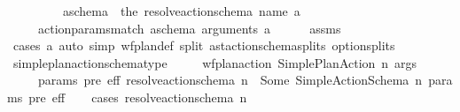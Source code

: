 \begin{isabellebody}
\ \ \ \ \ \ \ \ \ {\isachardoublequoteopen}a\isactrlsub s\isactrlsub c\isactrlsub h\isactrlsub e\isactrlsub m\isactrlsub a\ {\isacharequal}{\kern0pt}\ the\ {\isacharparenleft}{\kern0pt}resolve{\isacharunderscore}{\kern0pt}action{\isacharunderscore}{\kern0pt}schema\ {\isacharparenleft}{\kern0pt}name\ a{\isacharparenright}{\kern0pt}{\isacharparenright}{\kern0pt}{\isachardoublequoteclose}\isanewline
\ \ \ \ \ {\isachardoublequoteopen}action{\isacharunderscore}{\kern0pt}params{\isacharunderscore}{\kern0pt}match\ a\isactrlsub s\isactrlsub c\isactrlsub h\isactrlsub e\isactrlsub m\isactrlsub a\ {\isacharparenleft}{\kern0pt}arguments\ a{\isacharparenright}{\kern0pt}{\isachardoublequoteclose}\isanewline
%
\isadelimproof
\ \ \ \ %
\endisadelimproof
%
\isatagproof
{}\isamarkupfalse%
\ assms\ \isamarkupfalse%
\ {\isacharparenleft}{\kern0pt}cases\ a{\isacharparenright}{\kern0pt}\ {\isacharparenleft}{\kern0pt}auto\ simp{\isacharcolon}{\kern0pt}\ wf{\isacharunderscore}{\kern0pt}plan{\isacharunderscore}{\kern0pt}def\ split{\isacharcolon}{\kern0pt}\ ast{\isacharunderscore}{\kern0pt}action{\isacharunderscore}{\kern0pt}schema{\isachardot}{\kern0pt}splits\ option{\isachardot}{\kern0pt}splits{\isacharparenright}{\kern0pt}%
\endisatagproof
{\isafoldproof}%
%
\isadelimproof
\isanewline
%
\endisadelimproof
\isanewline
\ \ \isamarkupfalse%
\ simple{\isacharunderscore}{\kern0pt}plan{\isacharunderscore}{\kern0pt}action{\isacharunderscore}{\kern0pt}schema{\isacharunderscore}{\kern0pt}type{}{\isacharcolon}{\kern0pt}\isanewline
\ \ \ \ \ {\isachardoublequoteopen}wf{\isacharunderscore}{\kern0pt}plan{\isacharunderscore}{\kern0pt}action\ {\isacharparenleft}{\kern0pt}Simple{\isacharunderscore}{\kern0pt}Plan{\isacharunderscore}{\kern0pt}Action\ n\ args{\isacharparenright}{\kern0pt}{\isachardoublequoteclose}\isanewline
\ \ \ \ \ {\isachardoublequoteopen}{\isasymexists}params\ pre\ eff{\isachardot}{\kern0pt}\ resolve{\isacharunderscore}{\kern0pt}action{\isacharunderscore}{\kern0pt}schema\ n\ {\isacharequal}{\kern0pt}\ Some\ {\isacharparenleft}{\kern0pt}Simple{\isacharunderscore}{\kern0pt}Action{\isacharunderscore}{\kern0pt}Schema\ n\ params\ pre\ eff{\isacharparenright}{\kern0pt}{\isachardoublequoteclose}\isanewline
%
\isadelimproof
\ \ %
\endisadelimproof
%
\isatagproof
{}\isamarkupfalse%
\ {\isacharparenleft}{\kern0pt}cases\ {\isachardoublequoteopen}resolve{\isacharunderscore}{\kern0pt}action{\isacharunderscore}{\kern0pt}schema\ n{\isachardoublequoteclose}{\isacharparenright}{\kern0pt}\isanewline

\end{isabellebody}
